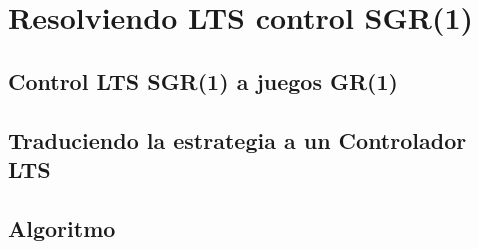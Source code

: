 \section{Resolviendo LTS control SGR(1)}

\subsection{Control LTS SGR(1) a juegos GR(1)}

\subsection{Traduciendo la estrategia a un Controlador LTS}

\subsection{Algoritmo}
